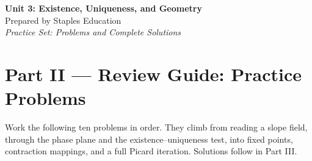 




\begin{center}
    {\LARGE \bfseries Unit 3: Existence, Uniqueness, and Geometry}\\[6pt]
    {\large Prepared by Staples Education}\\[4pt]
    {\itshape Practice Set: Problems and Complete Solutions}
\end{center}

\vspace{0.4em}

{}
\section*{Part II --- Review Guide: Practice Problems}

Work the following ten problems in order. They climb from reading a slope field,
through the phase plane and the existence--uniqueness test, into fixed points,
contraction mappings, and a full Picard iteration. Solutions follow in Part III.

